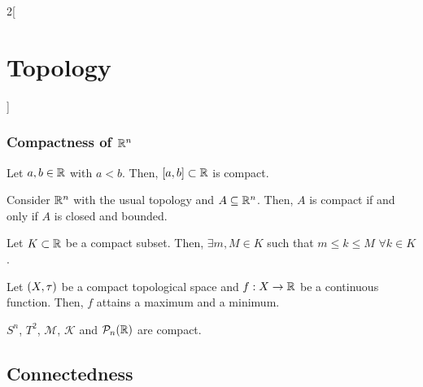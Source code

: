 \documentclass[../../../main.tex]{subfiles}
\begin{document}
\begin{multicols}{2}[\section{Topology}]
  \subsubsection{Compactness of \texorpdfstring{$\mathbb{R}^n$}{Rn}}
  \begin{theorem}
    Let $a,b\in\mathbb{R}$ with $a<b$. Then, $[a,b]\subset\mathbb{R}$ is compact.
  \end{theorem}
  \begin{theorem}
    Consider $\mathbb{R}^n$ with the usual topology and $A\subseteq \mathbb{R}^n$. Then, $A$ is compact if and only if $A$ is closed and bounded.
  \end{theorem}
  \begin{lemma}
    Let $K\subset\mathbb{R}$ be a compact subset. Then, $\exists m,M\in K$ such that $m\leq k\leq M$ $\forall k\in K$.
  \end{lemma}
  \begin{theorem}
    Let $(X,\tau)$ be a compact topological space and $f:X\rightarrow\mathbb{R}$ be a continuous function. Then, $f$ attains a maximum and a minimum.
  \end{theorem}
  \begin{prop}
    $S^n$, $T^2$, $\mathcal{M}$, $\mathcal{K}$ and $\mathcal{P}_n(\mathbb{R})$ are compact.
  \end{prop}
  \subsection{Connectedness}

\end{multicols}
\end{document}
